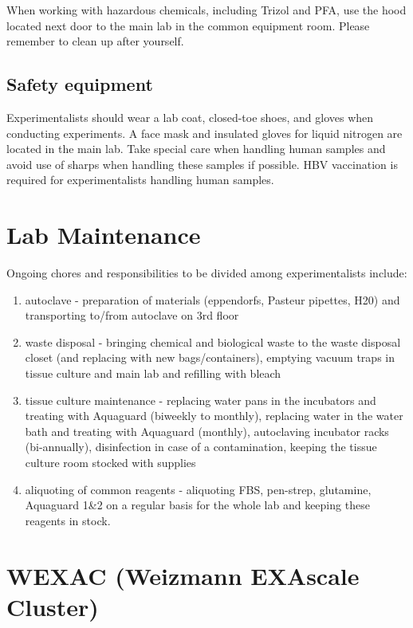 \documentclass[
]{book}
\providecommand{\tightlist}{%
  \setlength{\itemsep}{0pt}\setlength{\parskip}{0pt}}
\begin{document}
When working with hazardous chemicals, including Trizol and PFA, use the hood located next door to the main lab in the common equipment room. Please remember to clean up after yourself.

\hypertarget{safety-equipment}{%
\section{Safety equipment}\label{safety-equipment}}

Experimentalists should wear a lab coat, closed-toe shoes, and gloves when conducting experiments. A face mask and insulated gloves for liquid nitrogen are located in the main lab. Take special care when handling human samples and avoid use of sharps when handling these samples if possible. HBV vaccination is required for experimentalists handling human samples.

\hypertarget{labMaintenance}{%
\chapter{Lab Maintenance}\label{labMaintenance}}

Ongoing chores and responsibilities to be divided among experimentalists include:

\begin{enumerate}
\def\labelenumi{\arabic{enumi}.}
\tightlist
\item
  autoclave - preparation of materials (eppendorfs, Pasteur pipettes, H20) and transporting to/from autoclave on 3rd floor
\item
  waste disposal - bringing chemical and biological waste to the waste disposal closet (and replacing with new bags/containers), emptying vacuum traps in tissue culture and main lab and refilling with bleach
\item
  tissue culture maintenance - replacing water pans in the incubators and treating with Aquaguard (biweekly to monthly), replacing water in the water bath and treating with Aquaguard (monthly), autoclaving incubator racks (bi-annually), disinfection in case of a contamination, keeping the tissue culture room stocked with supplies
\item
  aliquoting of common reagents - aliquoting FBS, pen-strep, glutamine, Aquaguard 1\&2 on a regular basis for the whole lab and keeping these reagents in stock.
\end{enumerate}

\hypertarget{wexac}{%
\chapter{WEXAC (Weizmann EXAscale Cluster)}\label{wexac}}
\end{document}
